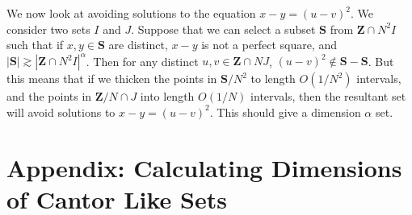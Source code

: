 \documentclass{report}
\theoremstyle{plain}
\theoremstyle{plain}
\begin{document}
We now look at avoiding solutions to the equation $x - y = (u - v)^2$. We consider two sets $I$ and $J$. Suppose that we can select a subset $\mathbf{S}$ from $\mathbf{Z} \cap N^2I$ such that if $x,y \in \mathbf{S}$ are distinct, $x - y$ is not a perfect square, and $|\mathbf{S}| \gtrsim |\mathbf{Z} \cap N^2I|^\alpha$. Then for any distinct $u,v \in \mathbf{Z} \cap NJ$, $(u - v)^2 \not \in \mathbf{S} - \mathbf{S}$. But this means that if we thicken the points in $\mathbf{S}/N^2$ to length $O(1/N^2)$ intervals, and the points in $\mathbf{Z}/N \cap J$ into length $O(1/N)$ intervals, then the resultant set will avoid solutions to $x - y = (u - v)^2$. This should give a dimension $\alpha$ set.






\chapter{Appendix: Calculating Dimensions of Cantor Like Sets}
\end{document}
